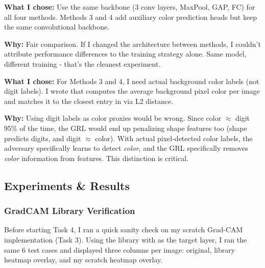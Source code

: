 \documentclass[9pt,a4paper,twocolumn,twoside]{tau-class/tau}
\begin{document}
        \begin{tauenv}[frametitle=Decision: Same SimpleGAPCNN Architecture for All Methods]
            \textbf{What I chose:} Use the same  backbone (3 conv layers, MaxPool, GAP, FC) for all four methods. Methods 3 and 4 add auxiliary color prediction heads but keep the same convolutional backbone.

            \textbf{Why:} Fair comparison. If I changed the architecture between methods, I couldn't attribute performance differences to the training strategy alone. Same model, different training - that's the cleanest experiment.
        \end{tauenv}

        \begin{tauenv}[frametitle={Decision: detect\_color\_labels() Uses Pixel-Level Color Detection}]
            \textbf{What I chose:} For Methods 3 and 4, I need actual background color labels (not digit labels). I wrote  that computes the average background pixel color per image and matches it to the closest entry in  via L2 distance.

            \textbf{Why:} Using digit labels as color proxies would be wrong. Since color $\approx$ digit 95\% of the time, the GRL would end up penalizing shape features too (shape predicts digits, and digit $\approx$ color). With actual pixel-detected color labels, the adversary specifically learns to detect \textit{color}, and the GRL specifically removes \textit{color} information from features. This distinction is critical.
        \end{tauenv}

    \subsection{Experiments \& Results}

        \subsubsection{GradCAM Library Verification}

        Before starting Task 4, I ran a quick sanity check on my scratch Grad-CAM implementation (Task 3). Using the  library with  as the target layer, I ran the same 6 test cases and displayed three columns per image: original, library heatmap overlay, and my scratch heatmap overlay.
\end{document}
